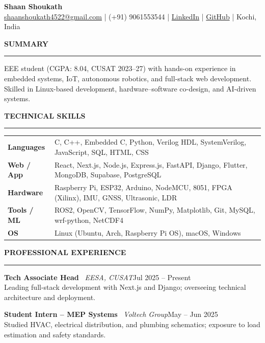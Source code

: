\documentclass[9.5pt, a4paper]{article}
\newcommand{\cvsection}[1]{%
  \vspace{4pt}%
  {\color{accent}\textbf{\MakeUppercase{#1}}}\\[-5pt]
  {\color{rulecol}\rule{\linewidth}{0.5pt}}%
  \vspace{1pt}%
}
\newcommand{\entry}[4]{%
  \textbf{#1} \textbar\ \textit{#2}\hfill{\small\color{subtle}#3}\\
  {\small #4}%
}
\begin{document}
\begin{center}
  {\Large\textbf{Shaan Shoukath}}\\[3pt]
  \small
  \href{mailto:shaanshoukath4522@gmail.com}{shaanshoukath4522@gmail.com}
  \;|\; (+91) 9061553544
  \;|\; \href{https://www.linkedin.com/in/shaan-shoukath-04a9b12b2/}{LinkedIn}
  \;|\; \href{https://github.com/Shaan-Shoukath}{GitHub}
  \;|\; Kochi, India
\end{center}

\cvsection{Summary}
{\small EEE student (CGPA: 8.04, CUSAT 2023--27) with hands-on experience in embedded systems, IoT, autonomous robotics, and full-stack web development. Skilled in Linux-based development, hardware--software co-design, and AI-driven systems.}

\cvsection{Technical Skills}
\begin{tabularx}{\linewidth}{@{} l @{\hspace{6pt}} X @{}}
  \small\textbf{Languages}  & \small C, C++, Embedded C, Python, Verilog HDL, SystemVerilog, JavaScript, SQL, HTML, CSS \\
  \small\textbf{Web / App}  & \small React, Next.js, Node.js, Express.js, FastAPI, Django, Flutter, MongoDB, Supabase, PostgreSQL \\
  \small\textbf{Hardware}   & \small Raspberry Pi, ESP32, Arduino, NodeMCU, 8051, FPGA (Xilinx), IMU, GNSS, Ultrasonic, LDR \\
  \small\textbf{Tools / ML} & \small ROS2, OpenCV, TensorFlow, NumPy, Matplotlib, Git, MySQL, wrf-python, NetCDF4 \\
  \small\textbf{OS}         & \small Linux (Ubuntu, Arch, Raspberry Pi OS), macOS, Windows \\
\end{tabularx}

\cvsection{Professional Experience}

\entry{Tech Associate Head}{EESA, CUSAT}{Jul 2025 – Present}%
      {Leading full-stack development with Next.js and Django; overseeing technical architecture and deployment.}

\vspace{3pt}
\entry{Student Intern – MEP Systems}{Voltech Group}{May – Jun 2025}%
      {Studied HVAC, electrical distribution, and plumbing schematics; exposure to load estimation and safety standards.}
\end{document}
